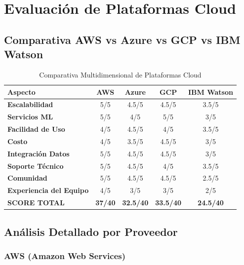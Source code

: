 \documentclass[11pt,letterpaper]{article}
\begin{document}
\section{Evaluación de Plataformas Cloud}

\subsection{Comparativa AWS vs Azure vs GCP vs IBM Watson}

\begin{table}[H]
\centering
\caption{Comparativa Multidimensional de Plataformas Cloud}
\begin{tabular}{|l|cccc|}
\hline
\textbf{Aspecto} & \textbf{AWS} & \textbf{Azure} & \textbf{GCP} & \textbf{IBM Watson} \\
\hline
\textbf{Escalabilidad} & 5/5 & 4.5/5 & 4.5/5 & 3.5/5 \\
\hline
\textbf{Servicios ML} & 5/5 & 4/5 & 5/5 & 3/5 \\
\hline
\textbf{Facilidad de Uso} & 4/5 & 4.5/5 & 4/5 & 3.5/5 \\
\hline
\textbf{Costo} & 4/5 & 3.5/5 & 4.5/5 & 3/5 \\
\hline
\textbf{Integración Datos} & 5/5 & 4.5/5 & 4.5/5 & 3/5 \\
\hline
\textbf{Soporte Técnico} & 5/5 & 4.5/5 & 4/5 & 3.5/5 \\
\hline
\textbf{Comunidad} & 5/5 & 4.5/5 & 4.5/5 & 2.5/5 \\
\hline
\textbf{Experiencia del Equipo} & 4/5 & 3/5 & 3/5 & 2/5 \\
\hline
\hline
\textbf{SCORE TOTAL} & \textbf{37/40} & \textbf{32.5/40} & \textbf{33.5/40} & \textbf{24.5/40} \\
\hline
\end{tabular}
\end{table}

\subsection{Análisis Detallado por Proveedor}

\subsubsection{AWS (Amazon Web Services)}
\end{document}
